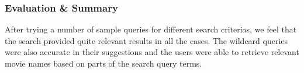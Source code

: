 \subsubsection{Evaluation \& Summary}
After trying a number of sample queries for different search criterias, we feel that the search provided quite relevant results in all the cases. The wildcard queries were also accurate in their suggestions and the users were able to retrieve relevant movie names based on parts of the search query terms. 